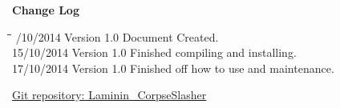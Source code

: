 \documentclass[letterpaper]{article}
\begin{document}
\begin{titlepage}
\begin{center}
\end{center}
\vfill %

\end{titlepage}
	\newpage
	{\LARGE \bf Change Log}\\[2em]
	
	\begin{tabbing}
			\hspace*{2.5cm}\=\hspace*{2.5cm}\=\hspace*{8cm}\=\hspace*{3cm} /10/2014\> Version 1.0\> Document Created. \\
			15/10/2014\> Version 1.0\> Finished compiling and installing. \\
			17/10/2014\> Version 1.0 \> Finished off how to use and maintenance.		\\
	\end{tabbing}
	
		\newpage
		\renewcommand\contentsname{TABLE OF CONTENTS}
		\newcommand\contentsnameLC{\colorbox{black}{\makebox[\textwidth-2\fboxsep][l]{\bfseries\color{red} Table of Contents}}}
		
		\renewcommand{\cftdot}{}
		\hypersetup{linktocpage}
		\tableofcontents
		
		\begin{flushleft}
			\LARGE\href{https://github.com/njTaljaard/Laminin_CorpseSlasher/}{Git repository: Laminin\_CorpseSlasher}
		\end{flushleft}
		
	\newpage
		\section*{\colorbox{black}{}} 
	\vspace{0.1in}
	
\end{document}
